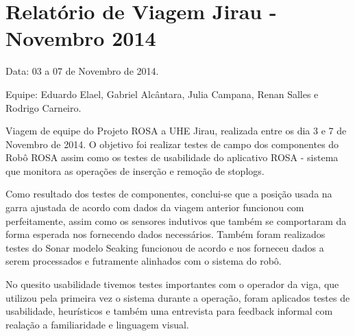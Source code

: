 \section{Relatório de Viagem Jirau - Novembro 2014}
Data: 03 a 07 de Novembro de 2014.

Equipe: Eduardo Elael, Gabriel Alcântara, Julia Campana, Renan Salles e Rodrigo Carneiro.


Viagem de equipe do Projeto ROSA a UHE Jirau, realizada entre
os dia 3 e 7 de Novembro de 2014. O objetivo foi realizar testes de campo dos
componentes do Robô ROSA assim como os testes de usabilidade do aplicativo ROSA
- sistema que monitora as operações de inserção e remoção de stoplogs.

Como resultado dos testes de componentes, conclui-se que a posição usada na
garra ajustada de acordo com dados da viagem anterior funcionou com
perfeitamente, assim como  os sensores indutivos que também se comportaram da
forma esperada nos fornecendo dados necessários.  Também foram realizados
testes do Sonar modelo Seaking funcionou de acordo e nos forneceu dados a serem
processados e futramente alinhados com o sistema do robô.

No quesito usabilidade tivemos testes importantes com o operador da viga, que
utilizou pela primeira vez o sistema durante a operação, foram aplicados
testes de usabilidade, heurísticos e também uma entrevista para feedback
informal com realação a familiaridade e linguagem visual.



